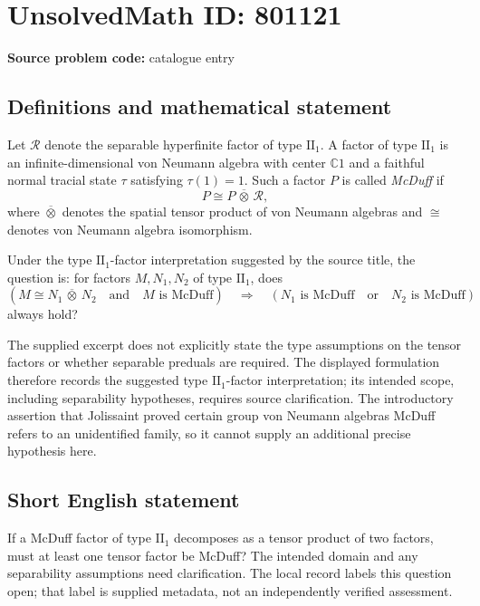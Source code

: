 \documentclass[11pt]{article}
\newcommand{\C}{\mathbb{C}}
\begin{document}
\section*{UnsolvedMath ID: 801121}
\textbf{Source problem code:} catalogue entry
\subsection{Definitions and mathematical statement}
Let \(\mathcal R\) denote the separable hyperfinite factor of type \(\mathrm{II}_1\). A factor of type \(\mathrm{II}_1\) is an infinite-dimensional von Neumann algebra with center \(\C 1\) and a faithful normal tracial state \(\tau\) satisfying \(\tau(1)=1\). Such a factor \(P\) is called \emph{McDuff} if
\[
P\cong P\,\overline{\otimes}\,\mathcal R,
\]
where \(\overline{\otimes}\) denotes the spatial tensor product of von Neumann algebras and \(\cong\) denotes von Neumann algebra isomorphism.

Under the type \(\mathrm{II}_1\)-factor interpretation suggested by the source title, the question is: for factors \(M,N_1,N_2\) of type \(\mathrm{II}_1\), does
\[
\left(M\cong N_1\,\overline{\otimes}\,N_2
\quad\text{and}\quad M\text{ is McDuff}\right)
\quad\Longrightarrow\quad
\left(N_1\text{ is McDuff}\quad\text{or}\quad N_2\text{ is McDuff}\right)
\]
always hold?

The supplied excerpt does not explicitly state the type assumptions on the tensor factors or whether separable preduals are required. The displayed formulation therefore records the suggested type \(\mathrm{II}_1\)-factor interpretation; its intended scope, including separability hypotheses, requires source clarification. The introductory assertion that Jolissaint proved certain group von Neumann algebras McDuff refers to an unidentified family, so it cannot supply an additional precise hypothesis here.
\subsection{Short English statement}
If a McDuff factor of type \(\mathrm{II}_1\) decomposes as a tensor product of two factors, must at least one tensor factor be McDuff? The intended domain and any separability assumptions need clarification. The local record labels this question open; that label is supplied metadata, not an independently verified assessment.
\end{document}
